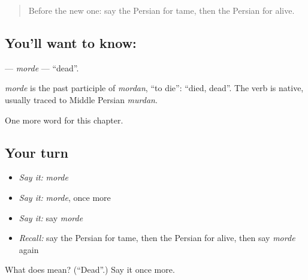 \begin{quote}
Before the new one: say the Persian for tame, then the Persian for alive.
\end{quote}

\subsection*{You'll want to know: }
\textbf{} — \emph{morde} — \textquotedblleft{}dead\textquotedblright{}.

\begin{cousinweb}
\emph{morde} is the past participle of \emph{mordan}, \textquotedblleft{}to die\textquotedblright{}: \textquotedblleft{}died, dead\textquotedblright{}. The verb is native, usually traced to Middle Persian \emph{murdan}.
\end{cousinweb}

\begin{grammarlens}[title={What you've built}]
One more word for this chapter.
\end{grammarlens}

\subsection*{Your turn}
\begin{itemize}
\raggedright
  \item \emph{Say it:} \emph{morde}
  \item \emph{Say it:} \emph{morde}, once more
  \item \emph{Say it:} say \emph{morde}
  \item \emph{Recall:} say the Persian for tame, then the Persian for alive, then say \emph{morde} again
\end{itemize}

\begin{tcolorbox}[breakable,colback=teal!4,colframe=teal!35!black,title={Before you move on}]
What does  mean? (\textquotedblleft{}Dead\textquotedblright{}.) Say it once more.
\end{tcolorbox}
